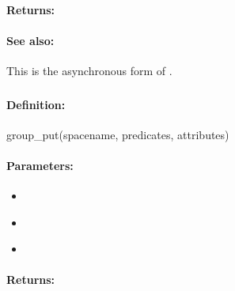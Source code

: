 \paragraph{Returns:}


\paragraph{See also:}  This is the asynchronous form of .

\pagebreak
\subsubsection{}
\label{api:ruby:group_put}


\paragraph{Definition:}
\begin{rubycode}
group_put(spacename, predicates, attributes)
\end{rubycode}

\paragraph{Parameters:}
\begin{itemize}[noitemsep]
\item {}\\

\item {}\\

\item {}\\

\end{itemize}

\paragraph{Returns:}


\pagebreak
\subsubsection{}
\label{api:ruby:async_group_put}


